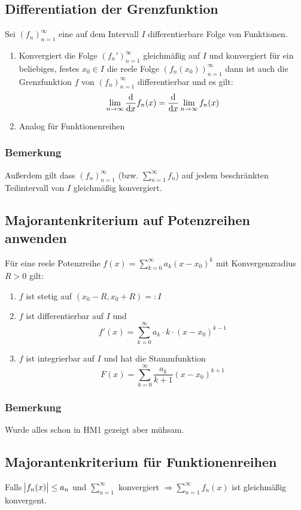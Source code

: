 \subsection{Differentiation der Grenzfunktion}
Sei ${(f_n)}_{n=1}^\infty$ eine auf dem Intervall $I$ differentierbare Folge von
Funktionen.
\begin{enumerate}[label= (\alph*)]
    \item Konvergiert die Folge ${(f_n')}_{n=1}^\infty$ gleichmäßig auf $I$ und konvergiert
    für ein beliebiges, festes $x_0 \in I$ die reele Folge ${(f_n(x_0))}_{n=1}^\infty$
    dann ist auch die Grenzfunktion $f$ von ${(f_n)}_{n=1}^\infty$ differentierbar
    und es gilt:
    \begin{equation*}
        \lim_{n \rightarrow \infty} \dfrac{\text{d}}{\text{d}x} f_n(x) = \dfrac{\text{d}}{\text{d}x} \lim_{n \rightarrow \infty} f_n(x)
    \end{equation*}
    \item Analog für Funktionenreihen
\end{enumerate}

\subsubsection{Bemerkung}
Außerdem gilt dass ${(f_n)}_{n=1}^\infty$ (bzw. $\sum_{n=1}^\infty f_n$) auf jedem
beschränkten Teilintervall von $I$ gleichmäßig konvergiert.

\subsection{Majorantenkriterium auf Potenzreihen anwenden}
Für eine reele Potenzreihe $f(x) = \sum_{k=0}^\infty a_k {(x-x_0)}^k$ mit
Konvergenzradius $R > 0$ gilt:
\begin{enumerate}[label= (\alph*)]
    \item $f$ ist stetig auf $(x_0 - R, x_0 + R) =: I$
    \item $f$ ist differentierbar auf $I$ und
        \begin{equation*}
            f'(x) = \sum_{k=0}^\infty a_k \cdot k \cdot {(x-x_0)}^{k-1}
        \end{equation*}
    \item $f$ ist integrierbar auf $I$ und hat die Stammfunktion
        \begin{equation*}
            F(x) = \sum_{k=0}^\infty \frac{a_k}{k+1} {(x-x_0)}^{k+1}
        \end{equation*}
\end{enumerate}

\subsubsection{Bemerkung}
Wurde alles schon in HM1 gezeigt aber mühsam.

\subsection{Majorantenkriterium für Funktionenreihen}
Falls $\abs{f_n(x)} \leq a_n$ und $\sum_{n=1}^\infty$ konvergiert
$\Rightarrow \sum_{n=1}^\infty f_n(x)$ ist gleichmäßig konvergent.
